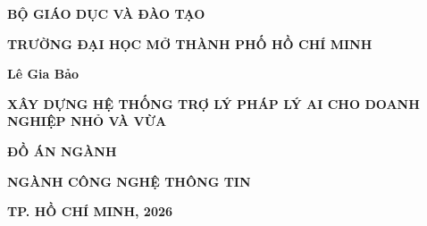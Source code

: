 \documentclass[12pt,a4paper]{report}
\numberwithin{equation}{chapter}
\numberwithin{figure}{chapter}
\numberwithin{table}{chapter}
\newcommand{\tenSV}{Lê Gia Bảo}
\newcommand{\tenDoAn}{XÂY DỰNG HỆ THỐNG TRỢ LÝ PHÁP LÝ AI CHO DOANH NGHIỆP NHỎ VÀ VỪA}
\newcommand{\tenNganh}{CÔNG NGHỆ THÔNG TIN}
\newcommand{\namBaoCao}{2026}
\begin{document}

\begin{titlepage}
\centering

{\bfseries BỘ GIÁO DỤC VÀ ĐÀO TẠO\par}
\vspace{0.3cm}
{\bfseries TRƯỜNG ĐẠI HỌC MỞ THÀNH PHỐ HỒ CHÍ MINH\par}

\vspace{3cm}

{\large\bfseries \tenSV\par}

\vspace{1cm}

{\Large\bfseries \tenDoAn\par}

\vspace{1.5cm}

{\huge\bfseries ĐỒ ÁN NGÀNH\par}

\vspace{0.8cm}

{\large\bfseries NGÀNH \tenNganh\par}

\vfill

{\bfseries TP. HỒ CHÍ MINH, \namBaoCao\par}

\end{titlepage}

\clearpage
\end{document}
